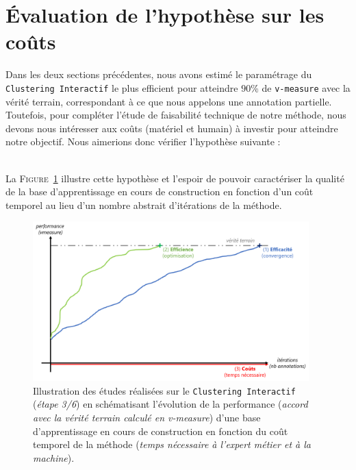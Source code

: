 \section{Évaluation de l'hypothèse sur les coûts}
\label{section:4.3-HYPOTHESE-COUTS}

	Dans les deux sections précédentes, nous avons estimé le paramétrage du \texttt{Clustering Interactif} le plus efficient pour atteindre $90$\% de \texttt{v-measure} avec la vérité terrain, correspondant à ce que nous appelons une annotation partielle.
	Toutefois, pour compléter l'étude de faisabilité technique de notre méthode, nous devons nous intéresser aux coûts (matériel et humain) à investir pour atteindre notre objectif.
	Nous aimerions donc vérifier l'hypothèse suivante :
	
	\begin{tcolorbox}[
		title=\faVial~\textbf{Hypothèse sur les coûts}~\faVial,
		colback=colorTcolorboxHypothesis!15,
		colframe=colorTcolorboxHypothesis!75,
		width=\linewidth
	]
		 \\
		
		La \textsc{Figure~\ref{figure:4.3-HYPOTHESE-COUTS}} illustre cette hypothèse et l'espoir de pouvoir caractériser la qualité de la base d'apprentissage en cours de construction en fonction d'un coût temporel au lieu d'un nombre abstrait d'itérations de la méthode. 
		\begin{figure}[H]  %
			\centering
			\includegraphics[width=0.95\textwidth]{figures/hypotheses-03-couts}
			\caption{
				Illustration des études réalisées sur le \texttt{Clustering Interactif} (\textit{étape 3/6}) en schématisant l'évolution de la performance (\textit{accord avec la vérité terrain calculé en v-measure}) d'une base d'apprentissage en cours de construction en fonction du coût temporel de la méthode (\textit{temps nécessaire à l'expert métier et à la machine}).
			}
			\label{figure:4.3-HYPOTHESE-COUTS}
		\end{figure}
	\end{tcolorbox}

